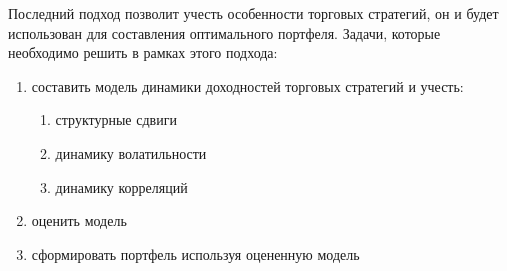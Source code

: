 Последний подход позволит учесть особенности торговых стратегий, он и будет использован для составления оптимального портфеля. Задачи, которые необходимо решить в рамках этого подхода:
\begin{enumerate}
	\item составить модель динамики доходностей торговых стратегий и учесть:
	\begin{enumerate}
		\item структурные сдвиги
		\item динамику волатильности
		\item динамику корреляций
	\end{enumerate}
	\item оценить модель
	\item сформировать портфель используя оцененную модель
\end{enumerate}